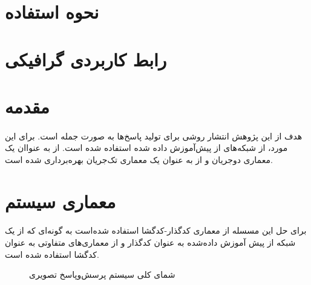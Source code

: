 \section{نحوه استفاده}
\paragraph{}{}

\section{رابط کاربردی گرافیکی}
\paragraph{}{

}

\section{مقدمه}
\paragraph{}{
    هدف از این پژوهش انتشار روشی برای تولید پاسخ‌ها به صورت جمله است. برای این 
    مورد، از شبکه‌های از پیش‌آموزش داده شده استفاده شده است. از 
     \cite{tan-bansal-2019-lxmert}
    به عنواان یک معماری دو‌جریان و از 
     \cite{li-etal-2020-bert-vision}
    به عنوان یک معماری تک‌جریان بهره‌برداری شده است. 
}



\section{
  معماری سیستم
 }

\paragraph{}{
    برای حل این مسسله از معماری کدگذار-کدگشا استفاده شده‌است به گونه‌ای 
    که از یک شبکه از پیش آموزش داده‌شده به عنوان کدگذار و از معماری‌های متفاوتی 
    به عنوان کدگشا استفاده شده است. 
    
}




\begin{figure}[H]
    \caption{شمای کلی سیستم پرسش‌و‌پاسخ تصویری}
    \label{fig:overview}
\end{figure}

